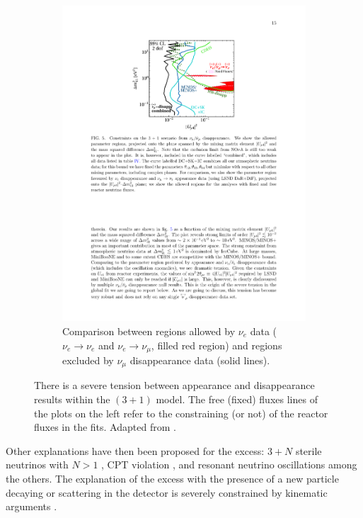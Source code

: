 \begin{figure}[htbp]
\begin{subfigure}{0.48\textwidth}
\begin{center}
    \includegraphics[width=\linewidth]{figures/nuenumu.pdf}
    \caption{Comparison between regions allowed by $\nu_e$ data ($\nu_e\rightarrow\nu_e$ and $\nu_e\rightarrow\nu_{\mu}$, filled red region) and regions excluded by $\nu_{\mu}$ disappearance data (solid lines).}\label{fig:nue_vs_numu}
    \end{center}
  \end{subfigure}
  \caption{There is a severe tension between appearance and disappearance results within the $(3+1)$ model. The free (fixed) fluxes lines of the plots on the left refer to the constraining (or not) of the reactor fluxes in the fits. Adapted from \cite{Dentler:2018sju}.}
\end{figure}


Other explanations have then been proposed for the excess: $3+N$ sterile neutrinos with $N>1$ \cite{Conrad:2012qt}, CPT violation \cite{Kostelecky:2011gq}, and resonant neutrino oscillations \cite{Asaadi:2017bhx} among the others. The explanation of the excess with the presence of a new particle decaying or scattering in the detector is severely constrained by kinematic arguments \cite{Jordan:2018qiy}.

